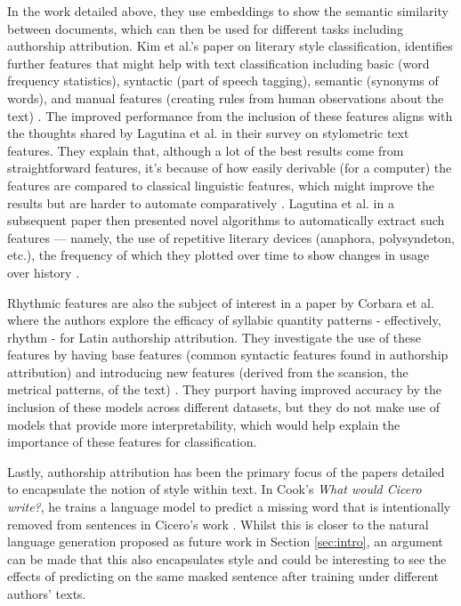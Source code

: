 \documentclass{csfourzero}
\begin{document}
In the work detailed above, they use embeddings to show the semantic similarity between documents, which can then be used for different tasks including authorship attribution. Kim et al.’s paper on literary style classification, identifies further features that might help with text classification including basic (word frequency statistics), syntactic (part of speech tagging), semantic (synonyms of words), and manual features (creating rules from human observations about the text) \cite{Kim2011LiterarySC}. The improved performance from the inclusion of these features aligns with the thoughts shared by Lagutina et al. in their survey on stylometric text features. They explain that, although a lot of the best results come from straightforward features, it's because of how easily derivable (for a computer) the features are compared to classical linguistic features, which might improve the results but are harder to automate comparatively \cite{inproceedings}. Lagutina et al. in a subsequent paper then presented novel algorithms to automatically extract such features --- namely, the use of repetitive literary devices (anaphora, polysyndeton, etc.), the frequency of which they plotted over time to show changes in usage over history \cite{lagutina2020automatic}. 

Rhythmic features are also the subject of interest in a paper by Corbara et al. where the authors explore the efficacy of syllabic quantity patterns - effectively, rhythm - for Latin authorship attribution. They investigate the use of these features by having base features (common syntactic features found in authorship attribution) and introducing new features (derived from the scansion, the metrical patterns, of the text) \cite{SyllabicQuantity}. They purport having improved accuracy by the inclusion of these models across different datasets, but they do not make use of models that provide more interpretability, which would help explain the importance of these features for classification. 

Lastly, authorship attribution has been the primary focus of the papers detailed to encapsulate the notion of style within text. In Cook’s \textit{What would Cicero write?}, he trains a language model to predict a missing word that is intentionally removed from sentences in Cicero’s work \cite{Cook_2021}. Whilst this is closer to the natural language generation proposed as future work in Section \ref{sec:intro}, an argument can be made that this also encapsulates style and could be interesting to see the effects of predicting on the same masked sentence after training under different authors' texts.
\end{document}

